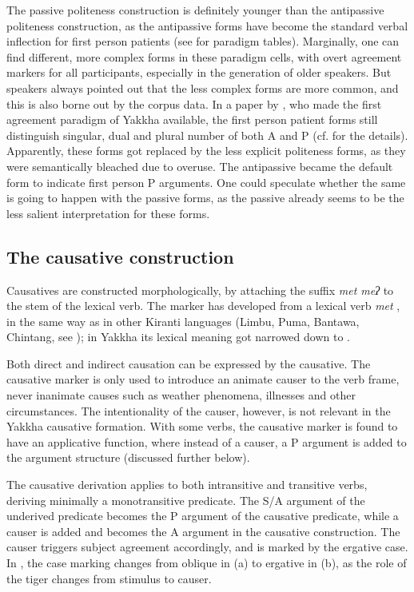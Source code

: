 The passive politeness construction is definitely younger than the antipassive politeness construction, as the antipassive forms have become the standard verbal inflection for first person patients (see  for paradigm tables). Marginally, one can find different, more complex forms in these paradigm cells, with overt agreement markers for all participants, especially in the generation of older speakers. But speakers always pointed out that the less complex forms are more common, and this is also borne out by the corpus data. In a paper by \citet[425]{Gvozdanovic1987How}, who made the first agreement paradigm of Yakkha available, the first person patient forms still distinguish singular, dual and plural number of both A and P (cf.  for the details). Apparently, these forms got replaced by the less explicit politeness forms, as they were semantically bleached due to overuse. The antipassive became the default form to indicate first person P arguments. One could speculate whether the same is going to happen with the passive forms, as the passive already seems to be the less salient interpretation for these forms.




\subsection{The causative construction}\label{caus}

Causatives are constructed morphologically, by attaching the suffix \emph{met \ti meʔ} to the stem of the lexical verb. The marker has developed from a lexical verb \emph{met} , in the same way as in other Kiranti languages (Limbu, Puma, Bantawa, Chintang, see \citealt{Driem1987A-grammar, Bickeletal2006The-Chintang, Doornenbal2009A-grammar}); in Yakkha its lexical meaning got narrowed down to . 

Both direct and indirect causation can be expressed by the causa\-tive. The causative marker is only used to introduce an animate causer to the verb frame, never inanimate causes such as weather phenomena, illnesses and other circumstances. The intentionality of the causer, however, is not relevant in the Yakkha causative formation. With some verbs, the causative marker is found to have an applicative function,  where instead of a causer, a P argument is added to the argument structure (discussed further below).


The causative derivation applies to both intransitive and transitive verbs, deriving minimally a monotransitive predicate. The S/A argument of the underived predicate becomes the P argument of the causative predicate, while a causer is added and becomes the A argument in the causative construction. The causer triggers  subject agreement accordingly, and is marked by the ergative case. In \Next, the case marking changes from oblique in (a) to ergative in (b), as the role of the tiger changes from stimulus to causer.

